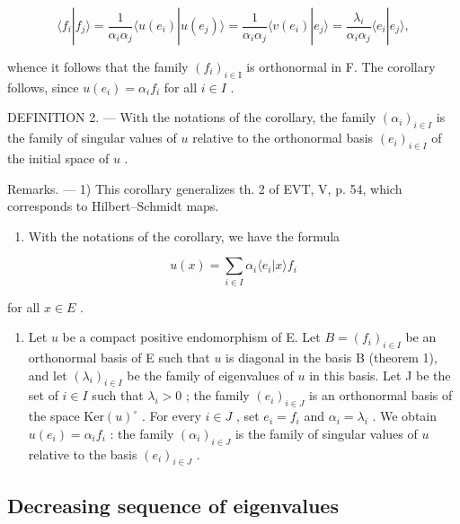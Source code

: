 \[
\langle f _ {i} | f _ {j} \rangle = \frac {1}{\alpha_ {i} \alpha_ {j}} \langle u (e _ {i}) | u (e _ {j}) \rangle = \frac {1}{\alpha_ {i} \alpha_ {j}} \langle v (e _ {i}) | e _ {j} \rangle = \frac {\lambda_ {i}}{\alpha_ {i} \alpha_ {j}} \langle e _ {i} | e _ {j} \rangle ,
\]

whence it follows that the family \((f_{i})_{i\in\mathrm{I}}\) is orthonormal in F. The corollary follows, since \(u(e_{i})=\alpha_{i}f_{i}\) for all \(i\in I\) .

DEFINITION 2. --- With the notations of the corollary, the family \((\alpha_{i})_{i\in I}\) is the family of singular values of \(u\) relative to the orthonormal basis \((e_{i})_{i\in I}\) of the initial space of \(u\) .

Remarks. --- 1) This corollary generalizes th. 2 of EVT, V, p. 54, which corresponds to Hilbert--Schmidt maps.

\begin{enumerate}
\def\labelenumi{\arabic{enumi})}
\setcounter{enumi}{1}
\tightlist
\item
  With the notations of the corollary, we have the formula
\end{enumerate}

\[
u (x) = \sum_ {i \in I} \alpha_ {i} \langle e _ {i} | x \rangle f _ {i}\tag{1}
\]

for all \(x \in E\) .

\begin{enumerate}
\def\labelenumi{\arabic{enumi})}
\setcounter{enumi}{2}
\tightlist
\item
  Let \(u\) be a compact positive endomorphism of E. Let \(B = (f_i)_{i \in I}\) be an orthonormal basis of E such that \(u\) is diagonal in the basis B (theorem 1), and let \((\lambda_i)_{i \in I}\) be the family of eigenvalues of \(u\) in this basis. Let J be the set of \(i \in I\) such that \(\lambda_i > 0\) ; the family \((e_i)_{i \in J}\) is an orthonormal basis of the space \(\text{Ker}(u)^{\circ}\) . For every \(i \in J\) , set \(e_i = f_i\) and \(\alpha_i = \lambda_i\) . We obtain \(u(e_i) = \alpha_if_i\) : the family \((\alpha_i)_{i \in J}\) is the family of singular values of \(u\) relative to the basis \((e_i)_{i \in J}\) .
\end{enumerate}

\subsection{Decreasing sequence of eigenvalues}

